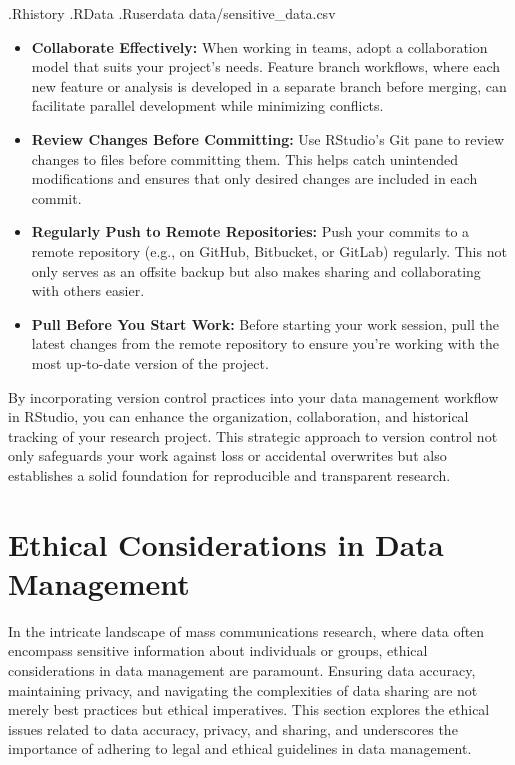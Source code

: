 \documentclass[
]{book}
\newenvironment{Shaded}{\begin{snugshade}}{\end{snugshade}}
\newcommand{\NormalTok}[1]{#1}
\begin{document}
\begin{Shaded}
\begin{Highlighting}[]
\NormalTok{.Rhistory}
\NormalTok{.RData}
\NormalTok{.Ruserdata}
\NormalTok{data/sensitive\_data.csv}
\end{Highlighting}
\end{Shaded}

\begin{itemize}
\item
  \textbf{Collaborate Effectively:} When working in teams, adopt a collaboration model that suits your project's needs. Feature branch workflows, where each new feature or analysis is developed in a separate branch before merging, can facilitate parallel development while minimizing conflicts.
\item
  \textbf{Review Changes Before Committing:} Use RStudio's Git pane to review changes to files before committing them. This helps catch unintended modifications and ensures that only desired changes are included in each commit.
\item
  \textbf{Regularly Push to Remote Repositories:} Push your commits to a remote repository (e.g., on GitHub, Bitbucket, or GitLab) regularly. This not only serves as an offsite backup but also makes sharing and collaborating with others easier.
\item
  \textbf{Pull Before You Start Work:} Before starting your work session, pull the latest changes from the remote repository to ensure you're working with the most up-to-date version of the project.
\end{itemize}

By incorporating version control practices into your data management workflow in RStudio, you can enhance the organization, collaboration, and historical tracking of your research project. This strategic approach to version control not only safeguards your work against loss or accidental overwrites but also establishes a solid foundation for reproducible and transparent research.

\hypertarget{ethical-considerations-in-data-management}{%
\section{Ethical Considerations in Data Management}\label{ethical-considerations-in-data-management}}

In the intricate landscape of mass communications research, where data often encompass sensitive information about individuals or groups, ethical considerations in data management are paramount. Ensuring data accuracy, maintaining privacy, and navigating the complexities of data sharing are not merely best practices but ethical imperatives. This section explores the ethical issues related to data accuracy, privacy, and sharing, and underscores the importance of adhering to legal and ethical guidelines in data management.
\end{document}
